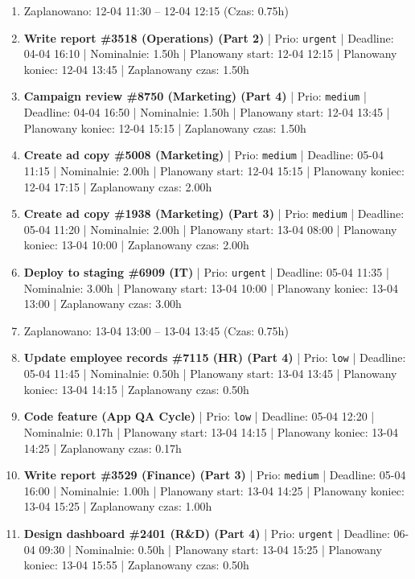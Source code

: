 {\begin{enumerate}
  \item [\textbf{PRZERWA}] Zaplanowano: 12-04 11:30 -- 12-04 12:15 (Czas: 0.75h)
  \item [\textbf{14598}] \textbf{Write report \#3518 (Operations) (Part 2)} | Prio: \texttt{urgent} | Deadline: 04-04 16:10 | Nominalnie: 1.50h | Planowany start: 12-04 12:15 | Planowany koniec: 12-04 13:45 | Zaplanowany czas: 1.50h
  \item [\textbf{14632}] \textbf{Campaign review \#8750 (Marketing) (Part 4)} | Prio: \texttt{medium} | Deadline: 04-04 16:50 | Nominalnie: 1.50h | Planowany start: 12-04 13:45 | Planowany koniec: 12-04 15:15 | Zaplanowany czas: 1.50h
  \item [\textbf{14666}] \textbf{Create ad copy \#5008 (Marketing)} | Prio: \texttt{medium} | Deadline: 05-04 11:15 | Nominalnie: 2.00h | Planowany start: 12-04 15:15 | Planowany koniec: 12-04 17:15 | Zaplanowany czas: 2.00h
  \item [\textbf{14652}] \textbf{Create ad copy \#1938 (Marketing) (Part 3)} | Prio: \texttt{medium} | Deadline: 05-04 11:20 | Nominalnie: 2.00h | Planowany start: 13-04 08:00 | Planowany koniec: 13-04 10:00 | Zaplanowany czas: 2.00h
  \item [\textbf{14597}] \textbf{Deploy to staging \#6909 (IT)} | Prio: \texttt{urgent} | Deadline: 05-04 11:35 | Nominalnie: 3.00h | Planowany start: 13-04 10:00 | Planowany koniec: 13-04 13:00 | Zaplanowany czas: 3.00h
  \item [\textbf{PRZERWA}] Zaplanowano: 13-04 13:00 -- 13-04 13:45 (Czas: 0.75h)
  \item [\textbf{14701}] \textbf{Update employee records \#7115 (HR) (Part 4)} | Prio: \texttt{low} | Deadline: 05-04 11:45 | Nominalnie: 0.50h | Planowany start: 13-04 13:45 | Planowany koniec: 13-04 14:15 | Zaplanowany czas: 0.50h
  \item [\textbf{14703}] \textbf{Code feature (App QA Cycle)} | Prio: \texttt{low} | Deadline: 05-04 12:20 | Nominalnie: 0.17h | Planowany start: 13-04 14:15 | Planowany koniec: 13-04 14:25 | Zaplanowany czas: 0.17h
  \item [\textbf{14672}] \textbf{Write report \#3529 (Finance) (Part 3)} | Prio: \texttt{medium} | Deadline: 05-04 16:00 | Nominalnie: 1.00h | Planowany start: 13-04 14:25 | Planowany koniec: 13-04 15:25 | Zaplanowany czas: 1.00h
  \item [\textbf{14603}] \textbf{Design dashboard \#2401 (R\&D) (Part 4)} | Prio: \texttt{urgent} | Deadline: 06-04 09:30 | Nominalnie: 0.50h | Planowany start: 13-04 15:25 | Planowany koniec: 13-04 15:55 | Zaplanowany czas: 0.50h

\end{enumerate}}

